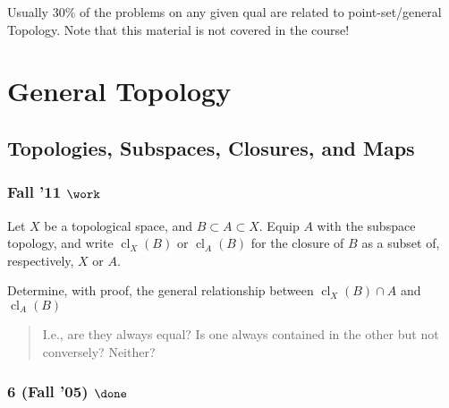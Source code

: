 \begin{warnings}

Usually 30\% of the problems on any given qual are related to
point-set/general Topology. Note that this material is not covered in
the course!

\end{warnings}

\hypertarget{general-topology}{%
\section{General Topology}\label{general-topology}}

\hypertarget{topologies-subspaces-closures-and-maps}{%
\subsection{Topologies, Subspaces, Closures, and
Maps}\label{topologies-subspaces-closures-and-maps}}

\hypertarget{fall-11-work}{%
\subsubsection{\texorpdfstring{Fall '11
\(\work\)}{Fall '11 \textbackslash work}}\label{fall-11-work}}

\begin{problem}[Fall 2011]

Let \(X\) be a topological space, and \(B \subset A \subset X\). Equip
\(A\) with the subspace topology, and write
\({ \operatorname{cl}} _X (B)\) or \({ \operatorname{cl}} _A (B)\) for
the closure of \(B\) as a subset of, respectively, \(X\) or \(A\).

Determine, with proof, the general relationship between
\({ \operatorname{cl}} _X (B) \cap A\) and
\({ \operatorname{cl}} _A (B)\)

\begin{quote}
I.e., are they always equal? Is one always contained in the other but
not conversely? Neither?
\end{quote}

\end{problem}

\hypertarget{fall-05-done}{%
\subsubsection{\texorpdfstring{6 (Fall '05)
\(\done\)}{6 (Fall '05) \textbackslash done}}\label{fall-05-done}}

